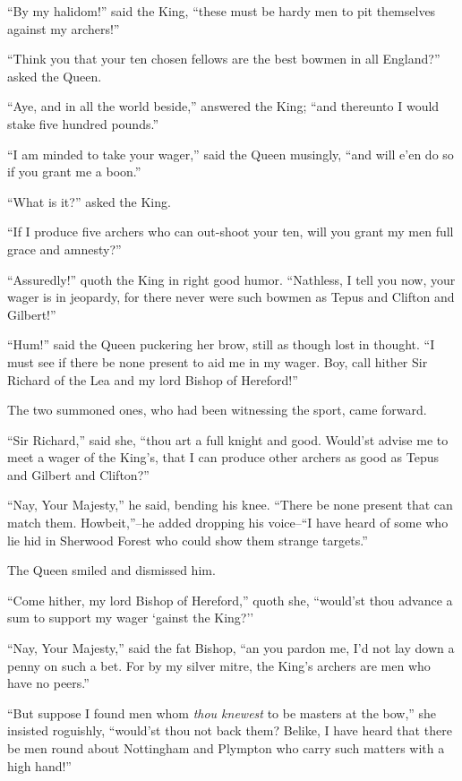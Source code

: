 ``By my halidom!'' said the King, ``these must be hardy men to pit
themselves against my archers!''

``Think you that your ten chosen fellows are the best bowmen in all
England?'' asked the Queen.

``Aye, and in all the world beside,'' answered the King; ``and thereunto
I would stake five hundred pounds.''

``I am minded to take your wager,'' said the Queen musingly, ``and will
e'en do so if you grant me a boon.''

``What is it?'' asked the King.

``If I produce five archers who can out-shoot your ten, will you grant
my men full grace and amnesty?''

``Assuredly!'' quoth the King in right good humor. ``Nathless, I tell
you now, your wager is in jeopardy, for there never were such bowmen as
Tepus and Clifton and Gilbert!''

``Hum!'' said the Queen puckering her brow, still as though lost in
thought. ``I must see if there be none present to aid me in my wager.
Boy, call hither Sir Richard of the Lea and my lord Bishop of
Hereford!''

The two summoned ones, who had been witnessing the sport, came forward.

``Sir Richard,'' said she, ``thou art a full knight and good. Would'st
advise me to meet a wager of the King's, that I can produce other
archers as good as Tepus and Gilbert and Clifton?''

``Nay, Your Majesty,'' he said, bending his knee. ``There be none
present that can match them. Howbeit,''--he added dropping his
voice--``I have heard of some who lie hid in Sherwood Forest who could
show them strange targets.''

The Queen smiled and dismissed him.

``Come hither, my lord Bishop of Hereford,'' quoth she, ``would'st thou
advance a sum to support my wager `gainst the King?''

``Nay, Your Majesty,'' said the fat Bishop, ``an you pardon me, I'd not
lay down a penny on such a bet. For by my silver mitre, the King's
archers are men who have no peers.''

``But suppose I found men whom \emph{thou knewest} to be masters at the
bow,'' she insisted roguishly, ``would'st thou not back them? Belike, I
have heard that there be men round about Nottingham and Plympton who
carry such matters with a high hand!''


